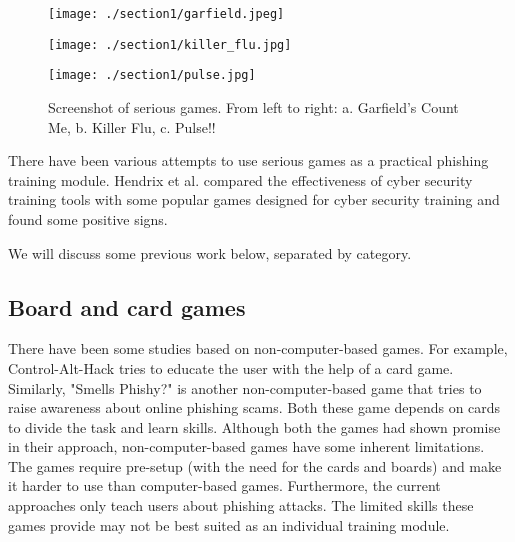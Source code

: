 \begin{figure}[h]
    \centering
    \begin{minipage}{0.32\textwidth}
        \centering
        \texttt{[image: ./section1/garfield.jpeg]}
    \end{minipage} \hfill
    \begin{minipage}{0.32\textwidth}
        \centering
        \texttt{[image: ./section1/killer\_flu.jpg]} %
    \end{minipage} \hfill
    \begin{minipage}{0.32\textwidth}
        \centering
        \texttt{[image: ./section1/pulse.jpg]} %
    \end{minipage}
    \caption[Example of serious games]{Screenshot of serious games. From left to right: a. Garfield’s Count Me, b. Killer Flu, c. Pulse!!}
\end{figure}

There have been various attempts to use serious games as a practical phishing training module. Hendrix et al. \cite{hendrix_al_sherbaz_bloom_2016} compared the effectiveness of cyber security training tools with some popular games designed for cyber security training and found some positive signs.

We will discuss some previous work below, separated by category.

\subsection{Board and card games}
There have been some studies based on non-computer-based games. For example, Control-Alt-Hack \cite{control_alt_hack} tries to educate the user with the help of a card game. Similarly, "Smells Phishy?"\cite{smels_phishy} is another non-computer-based game that tries to raise awareness about online phishing scams. Both these game depends on cards to divide the task and learn skills. Although both the games had shown promise in their approach, non-computer-based games have some inherent limitations. The games require pre-setup (with the need for the cards and boards) and make it harder to use than computer-based games. Furthermore, the current approaches only teach users about phishing attacks. The limited skills these games provide may not be best suited as an individual training module.


